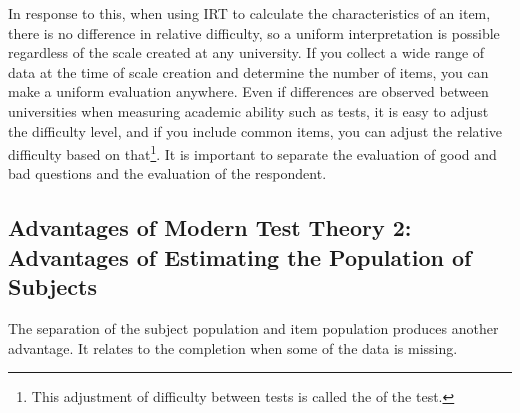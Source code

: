 \documentclass{ltjsbook}
\begin{document}
In response to this, when using IRT to calculate the characteristics of an item, there is no difference in relative difficulty, so a uniform interpretation is possible regardless of the scale created at any university. If you collect a wide range of data at the time of scale creation and determine the number of items, you can make a uniform evaluation anywhere. Even if differences are observed between universities when measuring academic ability such as tests, it is easy to adjust the difficulty level, and if you include common items, you can adjust the relative difficulty based on that\footnote{This adjustment of difficulty between tests is called the  of the test.}. It is important to separate the evaluation of good and bad questions and the evaluation of the respondent.
\subsection{Advantages of Modern Test Theory 2: Advantages of Estimating the Population of Subjects}
The separation of the subject population and item population produces another advantage. It relates to the completion when some of the data is missing.
\end{document}
